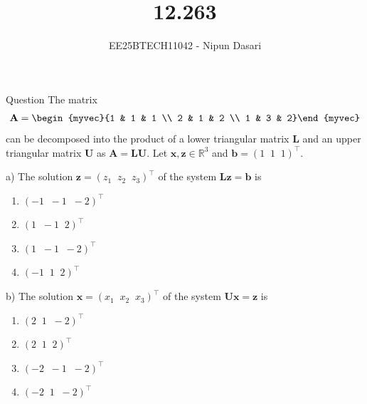 \documentclass{beamer}
\title{12.263}
\author{EE25BTECH11042 - Nipun Dasari}
\numberwithin{equation}{section}
\theoremstyle{remark}
\let\vec\mathbf
\begin{document}
	
	\begin{frame}
		\titlepage
	\end{frame}
	
	\begin{frame}{Question}
		The matrix
		\begin{align}
			\vec{A} = \begin{myvec}{1 & 1 & 1 \\ 2 & 1 & 2 \\ 1 & 3 & 2}\end{myvec}
		\end{align}
		can be decomposed into the product of a lower triangular matrix $\vec{L}$ and an upper triangular matrix $\vec{U}$ as $\vec{A} = \vec{L}\vec{U}$. Let $\vec{x}, \vec{z} \in \mathbb{R}^3$ and $\vec{b} = (1 \;\; 1 \;\; 1)^\top$.
		
		a) The solution $\vec{z} = (z_1 \;\; z_2 \;\; z_3)^\top$ of the system $\vec{L}\vec{z} = \vec{b}$ is
		\begin{enumerate}[label=\roman*)]
			\item $(-1 \;\; -1 \;\; -2)^\top$
			\item $(1 \;\; -1 \;\; 2)^\top$
			\item $(1 \;\; -1 \;\; -2)^\top$
			\item $(-1 \;\; 1 \;\; 2)^\top$
		\end{enumerate}
		
		b) The solution $\vec{x} = (x_1 \;\; x_2 \;\; x_3)^\top$ of the system $\vec{U}\vec{x} = \vec{z}$ is
		\begin{enumerate}[label=\roman*)]
			\item $(2 \;\; 1 \;\; -2)^\top$
			\item $(2 \;\; 1 \;\; 2)^\top$
			\item $(-2 \;\; -1 \;\; -2)^\top$
			\item $(-2 \;\; 1 \;\; -2)^\top$
		\end{enumerate}
	\end{frame}
	
\end{document}

